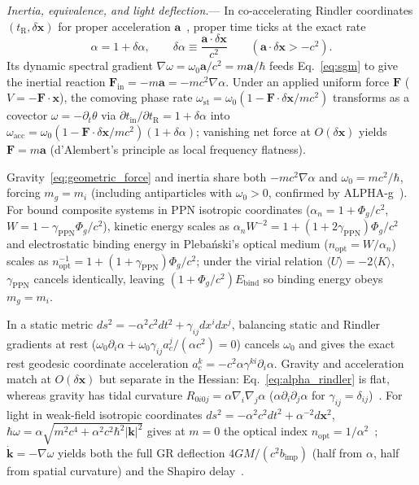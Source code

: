 \documentclass[aps,prl,reprint,superscriptaddress,nofootinbib,floatfix]{revtex4-2}
\theoremstyle{prlthm}
\newcommand{\prlsec}[1]{\par\smallskip\noindent\emph{#1.}---}
\begin{document}
\prlsec{Inertia, equivalence, and light deflection}
In co-accelerating Rindler coordinates $(t_\text{R},\delta\mathbf{x})$ for proper acceleration $\mathbf{a}$~\citep{MTW1973Gravitation}, proper time ticks at the exact rate
\begin{equation}
  \alpha=1+\delta\alpha,\qquad\delta\alpha\equiv\frac{\mathbf{a}\cdot\delta\mathbf{x}}{c^2}\qquad(\mathbf{a}\cdot\delta\mathbf{x}>-c^2).
  \label{eq:alpha_rindler}
\end{equation}
Its dynamic spectral gradient $\nabla\omega=\omega_0\mathbf{a}/c^2=m\mathbf{a}/\hbar$ feeds Eq.~\eqref{eq:sgm} to give the inertial reaction $\mathbf{F}_\text{in}=-m\mathbf{a}=-mc^2\nabla\alpha$. Under an applied uniform force $\mathbf{F}$ ($V=-\mathbf{F}\cdot\mathbf{x}$), the comoving phase rate $\omega_\text{st}=\omega_0(1-\mathbf{F}\cdot\delta\mathbf{x}/mc^2)$ transforms as a covector $\omega=-\partial_t\theta$ via $\partial t_\text{in}/\partial t_\text{R}=1+\delta\alpha$ into $\omega_\text{acc}=\omega_0(1-\mathbf{F}\cdot\delta\mathbf{x}/mc^2)(1+\delta\alpha)$; vanishing net force at $O(\delta\mathbf{x})$ yields $\mathbf{F}=m\mathbf{a}$ (d'Alembert's principle as local frequency flatness).

Gravity~\eqref{eq:geometric_force} and inertia share both $-mc^2\nabla\alpha$ and $\omega_0=mc^2/\hbar$, forcing $m_g=m_i$ (including antiparticles with $\omega_0>0$, confirmed by ALPHA-g~\citep{Anderson2023Observation}). For bound composite systems in PPN isotropic coordinates ($\alpha_n=1+\Phi_g/c^2$, $W=1-\gamma_\text{PPN}\Phi_g/c^2$), kinetic energy scales as $\alpha_n W^{-2}=1+(1+2\gamma_\text{PPN})\Phi_g/c^2$ and electrostatic binding energy in Pleba\'nski's optical medium ($n_\text{opt}=W/\alpha_n$) scales as $n_\text{opt}^{-1}=1+(1+\gamma_\text{PPN})\Phi_g/c^2$; under the virial relation $\langle U\rangle=-2\langle K\rangle$, $\gamma_\text{PPN}$ cancels identically, leaving $(1+\Phi_g/c^2)E_\text{bind}$ so binding energy obeys $m_g=m_i$.

In a static metric $ds^2=-\alpha^2c^2dt^2+\gamma_{ij}dx^idx^j$, balancing static and Rindler gradients at rest ($\omega_0\partial_i\alpha+\omega_0\gamma_{ij}a_c^j/(\alpha c^2)=0$) cancels $\omega_0$ and gives the exact rest geodesic coordinate acceleration $a_c^k=-c^2\alpha\gamma^{ki}\partial_i\alpha$. Gravity and acceleration match at $O(\delta\mathbf{x})$ but separate in the Hessian: Eq.~\eqref{eq:alpha_rindler} is flat, whereas gravity has tidal curvature $R_{0i0j}=\alpha\nabla_i\nabla_j\alpha$ ($\alpha\partial_i\partial_j\alpha$ for $\gamma_{ij}=\delta_{ij}$)~\citep{MTW1973Gravitation}. For light in weak-field isotropic coordinates $ds^2=-\alpha^2c^2dt^2+\alpha^{-2}d\mathbf{x}^2$, $\hbar\omega=\alpha\sqrt{m^2c^4+\alpha^2c^2\hbar^2|\mathbf{k}|^2}$ gives at $m=0$ the optical index $n_\text{opt}=1/\alpha^2$~\citep{deFelice1971Gravitational}; $\dot{\mathbf{k}}=-\nabla\omega$ yields both the full GR deflection $4GM/(c^2b_\text{imp})$ (half from $\alpha$, half from spatial curvature) and the Shapiro delay~\citep{Shapiro1964Fourth}.
\end{document}
